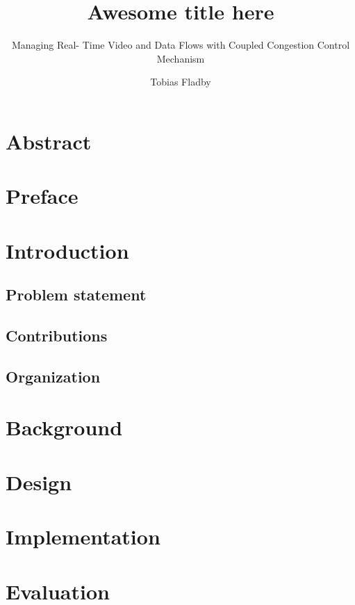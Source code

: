 \documentclass[UKenglish]{ifimaster}
\title{Awesome title here}
\subtitle{Managing Real- Time Video and Data Flows with Coupled Congestion Control Mechanism}
\author{Tobias Fladby}
\begin{document}
\duoforside[dept={Department of Informatics},   %
  program={programming and system architecture},  %
  long]                                       

\frontmatter{}
\chapter*{Abstract}            

\tableofcontents{}
\listoffigures{}
\listoftables{}

\chapter*{Preface}              

\mainmatter{}
\chapter{Introduction}              

\section{Problem statement}
\section{Contributions}

\section{Organization}

\chapter{Background}






\chapter{Design}

\chapter{Implementation}                 


\chapter{Evaluation}
\end{document}
